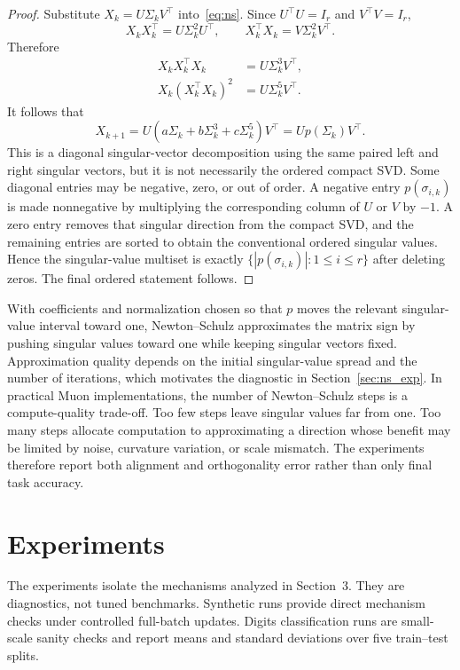 \documentclass[sigconf,nonacm]{acmart}
\begin{document}
\begin{proof}
Substitute $X_k=U\Sigma_kV^\top$ into~\eqref{eq:ns}. Since $U^\top U=I_r$ and $V^\top V=I_r$,
\begin{equation}
  X_kX_k^\top=U\Sigma_k^2U^\top,
  \qquad
  X_k^\top X_k=V\Sigma_k^2V^\top .
\end{equation}
Therefore
\begin{align}
  X_kX_k^\top X_k &= U\Sigma_k^3V^\top,\\
  X_k(X_k^\top X_k)^2 &= U\Sigma_k^5V^\top .
\end{align}
It follows that
\begin{equation}
  X_{k+1}=U(a\Sigma_k+b\Sigma_k^3+c\Sigma_k^5)V^\top
  =U p(\Sigma_k)V^\top .
\end{equation}
This is a diagonal singular-vector decomposition using the same paired left and right singular vectors, but it is not necessarily the ordered compact SVD. Some diagonal entries may be negative, zero, or out of order. A negative entry $p(\sigma_{i,k})$ is made nonnegative by multiplying the corresponding column of $U$ or $V$ by $-1$. A zero entry removes that singular direction from the compact SVD, and the remaining entries are sorted to obtain the conventional ordered singular values. Hence the singular-value multiset is exactly $\{|p(\sigma_{i,k})|:1\leq i\leq r\}$ after deleting zeros. The final ordered statement follows.
\end{proof}

With coefficients and normalization chosen so that $p$ moves the relevant singular-value interval toward one, Newton--Schulz approximates the matrix sign by pushing singular values toward one while keeping singular vectors fixed. Approximation quality depends on the initial singular-value spread and the number of iterations, which motivates the diagnostic in Section~\ref{sec:ns_exp}. In practical Muon implementations, the number of Newton--Schulz steps is a compute-quality trade-off. Too few steps leave singular values far from one. Too many steps allocate computation to approximating a direction whose benefit may be limited by noise, curvature variation, or scale mismatch. The experiments therefore report both alignment and orthogonality error rather than only final task accuracy.

\section{Experiments}
The experiments isolate the mechanisms analyzed in Section~3. They are diagnostics, not tuned benchmarks. Synthetic runs provide direct mechanism checks under controlled full-batch updates. Digits classification runs are small-scale sanity checks and report means and standard deviations over five train--test splits.
\end{document}
